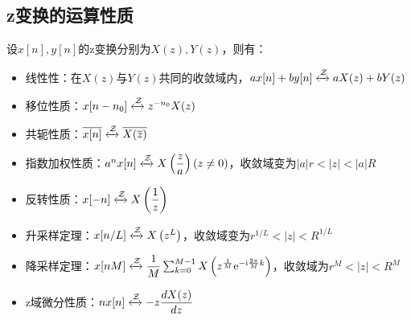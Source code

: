 \subsection{z变换的运算性质}\label{sub:z_operation}
\begin{proposition}[z变换的运算性质]\label{prop:z_operation}
    设$x[n],y[n]$的z变换分别为$X(z),Y(z)$，则有：
    \begin{itemize}
        \item 线性性：在$X(z)$与$Y(z)$共同的收敛域内，$a x[n]+b y[n]\xleftrightarrow{\mathcal{Z}} a X(z)+b Y(z)$
        \item 移位性质：$x[n-n_0]\xleftrightarrow{\mathcal{Z}} z^{-n_0}X(z)$
        \item 共轭性质：$\overline{x[n]}\xleftrightarrow{\mathcal{Z}} \overline{X(\overline{z})}$
        \item 指数加权性质：$a^{n} x[n]\xleftrightarrow{\mathcal{Z}} X\left(\dfrac{z}{a}\right)(z\neq 0)$，收敛域变为$|a|r<|z|<|a|R$
        \item 反转性质：$x[-n]\xleftrightarrow{\mathcal{Z}} X\left(\dfrac{1}{z}\right)$
        \item 升采样定理：$x[n/L]\xleftrightarrow{\mathcal{Z}} X\left(z^{L}\right)$，收敛域变为$r^{1/L}<|z|<R^{1/L}$
        \item 降采样定理：$x[nM]\xleftrightarrow{\mathcal{Z}} \dfrac{1}{M}\sum_{k=0}^{M-1}X\left(z^{\frac{1}{M}}\mathrm{e}^{-\mathrm{i}\frac{2\pi}{M}k}\right)$，收敛域为$r^{M}<|z|<R^{M}$
        \item z域微分性质：$n x[n]\xleftrightarrow{\mathcal{Z}} -z\dfrac{dX(z)}{dz}$
    \end{itemize}
\end{proposition}
